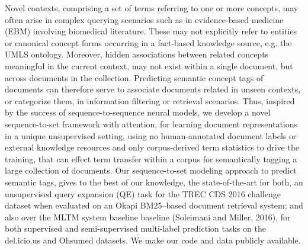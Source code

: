 Novel contexts, comprising a set of terms referring to one or more concepts, may often arise in complex querying scenarios such as in evidence-based medicine (EBM) involving biomedical literature. These may not explicitly refer to entities or canonical concept forms occurring in a fact-based knowledge source, e.g. the UMLS ontology. Moreover, hidden associations between related concepts meaningful in the current context, may not exist within a single document, but across documents in the collection. Predicting semantic concept tags of documents can therefore serve to associate  documents related in unseen contexts, or categorize them, in information filtering or retrieval scenarios. Thus, inspired by the success of sequence-to-sequence neural models, we develop a novel sequence-to-set framework with attention, for learning document representations in a unique unsupervised setting, using no human-annotated document labels or external knowledge resources and only corpus-derived term statistics to drive the training, that can effect term transfer within a corpus for semantically tagging a large collection of documents. Our sequence-to-set modeling approach to predict semantic tags, gives to the best of our knowledge, the state-of-the-art for both, an unsupervised query expansion (QE) task for the TREC CDS 2016 challenge dataset when evaluated on an Okapi BM25--based document retrieval system; and also over the MLTM system baseline baseline (Soleimani and Miller, 2016), for both supervised and semi-supervised multi-label prediction tasks on the del.icio.us and Ohsumed datasets. We make our code and data publicly available.
